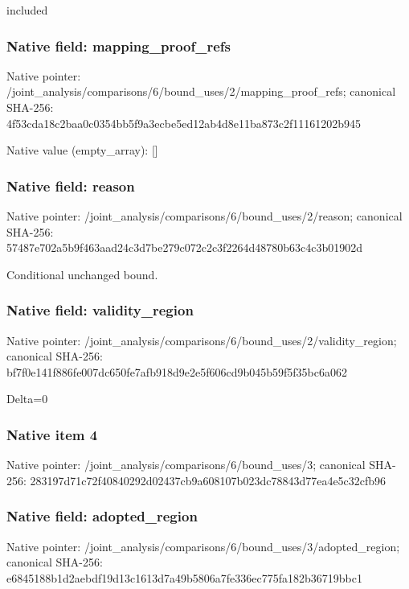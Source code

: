 \documentclass[10pt,a4paper]{article}
\begin{document}
\begingroup\raggedright\sloppy included\par\endgroup

\subsubsection{Native field: mapping\_\allowbreak{}proof\_\allowbreak{}refs}
Native pointer: /joint\_\allowbreak{}analysis/comparisons/6/bound\_\allowbreak{}uses/2/mapping\_\allowbreak{}proof\_\allowbreak{}refs; canonical SHA-256: 4f53cda18c2baa0c0354bb5f9a3ecbe5ed12ab4d8e11ba873c2f11161202b945

Native value (empty\_\allowbreak{}array): []

\subsubsection{Native field: reason}
Native pointer: /joint\_\allowbreak{}analysis/comparisons/6/bound\_\allowbreak{}uses/2/reason; canonical SHA-256: 57487e702a5b9f463aad24c3d7be279c072c2c3f2264d48780b63c4c3b01902d

\begingroup\raggedright\sloppy Conditional unchanged bound.\par\endgroup

\subsubsection{Native field: validity\_\allowbreak{}region}
Native pointer: /joint\_\allowbreak{}analysis/comparisons/6/bound\_\allowbreak{}uses/2/validity\_\allowbreak{}region; canonical SHA-256: bf7f0e141f886fe007dc650fe7afb918d9e2e5f606cd9b045b59f5f35bc6a062

\begingroup\raggedright\sloppy Delta=\allowbreak{}0\par\endgroup

\subsubsection{Native item 4}
Native pointer: /joint\_\allowbreak{}analysis/comparisons/6/bound\_\allowbreak{}uses/3; canonical SHA-256: 283197d71c72f40840292d02437cb9a608107b023dc78843d77ea4e5c32cfb96

\subsubsection{Native field: adopted\_\allowbreak{}region}
Native pointer: /joint\_\allowbreak{}analysis/comparisons/6/bound\_\allowbreak{}uses/3/adopted\_\allowbreak{}region; canonical SHA-256: e6845188b1d2aebdf19d13c1613d7a49b5806a7fe336ec775fa182b36719bbc1
\end{document}
